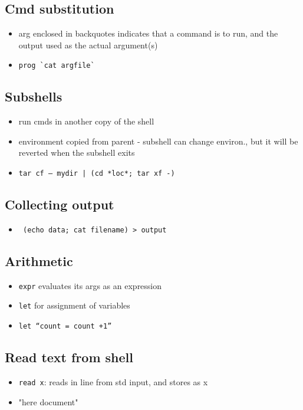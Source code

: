 \documentclass[10pt, multicolumn, a4paper]{article}
\begin{document}
\begin{multicols}{2}
	\subsection*{Cmd substitution}
	\begin{itemize}
	\item arg enclosed in backquotes indicates that a command is to run, and the output used as the actual argument(s)
	\item \verb|prog `cat argfile`|
	\end{itemize}
	\subsection*{Subshells}
	\begin{itemize}
	\item run cmds in another copy of the shell
	\item environment copied from parent - subshell can change environ., but it will be reverted when the subshell exits
	\item \texttt{tar cf – mydir | (cd *loc*; tar xf -)}
	\end{itemize}
	\subsection*{Collecting output}
	\begin{itemize}
	\item \verb| (echo data; cat filename) > output|
	\end{itemize}
	\subsection*{Arithmetic}
	\begin{itemize}
	\item \verb|expr| evaluates its args as an expression
	\item \verb|let| for assignment of variables 
	\item \verb|let “count = count +1”|
	\end{itemize}
	\subsection*{Read text from shell}
	\begin{itemize}
	\item \verb|read x|: reads in line from std input, and stores as x
	\item "here document"
	\end{itemize}

\end{multicols}
\end{document}
